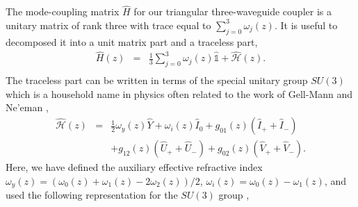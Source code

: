\documentclass[9pt,twocolumn,twoside]{osajnl}
\begin{document}
The mode-coupling matrix $\hat{H}$ for our triangular three-waveguide coupler is a unitary matrix of rank three with trace equal to $\sum_{j=0}^{3} \omega_{j}(z)$. 
It is useful to decomposed it into a unit matrix part and a traceless part, 
\begin{eqnarray}
	\hat{H}(z) &=& \frac{1}{3} \sum_{j=0}^{3} \omega_{j}(z) \hat{\mathbb{1}} + \hat{\mathcal{H}}(z). \\
\end{eqnarray}
The traceless part can be written in terms of the special unitary group $SU(3)$ which is  a household name in physics often related to the work of Gell-Mann \cite{GellMann1961} and Ne'eman \cite{Neeman1961p222},
\begin{eqnarray}
	\hat{\mathcal{H}}(z)&=& \frac{1}{2} \omega_{y}(z) \hat{Y}  + \omega_{i}(z) \hat{I}_{0}+ g_{01}(z) \left( \hat{I}_{+} + \hat{I}_{-} \right) \nonumber \\
			&&  + g_{12}(z) \left( \hat{U}_{+} + \hat{U}_{-} \right)  +   g_{02}(z) \left( \hat{V}_{+} + \hat{V}_{-} \right). \label{eq:MCMatrix}
\end{eqnarray}
Here, we have defined the auxiliary effective refractive index $\omega_{y}(z) = (\omega_{0}(z) + \omega_{1}(z) - 2 \omega_{2}(z))/2$, $\omega_{i}(z)= \omega_{0}(z)-\omega_{1}(z)$, and used the following representation for the $SU(3)$ group \cite{Ticciati1999}, 
\end{document}
